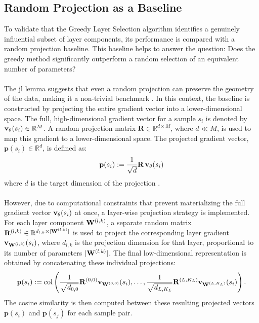 \subsection{Random Projection as a Baseline}\label{subsec:random_projection_as_a_baseline}
To validate that the Greedy Layer Selection algorithm identifies a genuinely influential subset of layer components, its performance is compared with a random projection baseline. This baseline helps to answer the question: Does the greedy method significantly outperform a random selection of an equivalent number of parameters?
\\\\
The \acrfull{jl} lemma suggests that even a random projection can preserve the geometry of the data, making it a non-trivial benchmark \cite{johnson_lindenstrauss}. In this context, the baseline is constructed by projecting the entire gradient vector into a lower-dimensional space. The full, high-dimensional gradient vector for a sample $s_i$ is denoted by $\vXsi[\theta] \in \mathbb{R}^M$. A random projection matrix $\mathbf{R} \in \mathbb{R}^{d \times M}$, where $d \ll M$, is used to map this gradient to a lower-dimensional space. The projected gradient vector, $\mathbf{p}(s_i) \in \mathbb{R}^d$, is defined as:
\begin{equation}
    \mathbf{p}(s_i) := \frac{1}{\sqrt{d}} \mathbf{R} \, \vXsi[\theta]
\end{equation}
where $d$ is the target dimension of the projection \cite{rakhshan2022rademacherrandomprojectionstensor}.
\\\\
However, due to computational constraints that prevent materializing the full gradient vector $\vXsi[\theta]$ at once, a layer-wise projection strategy is implemented. For each layer component $\Wlk$, a separate random matrix $\mathbf{R}^{(l,k)} \in \mathbb{R}^{d_{l,k} \times |\Wlk|}$ is used to project the corresponding layer gradient $\vXsi[\Wlk]$, where $d_{l,k}$ is the projection dimension for that layer, proportional to its number of parameters $|\Wlk|$. The final low-dimensional representation is obtained by concatenating these individual projections:
\begin{equation}
    \mathbf{p}(s_i) := \operatorname{col}\left( \frac{1}{\sqrt{d_{0,0}}} \mathbf{R}^{(0,0)} \vXsi[\W^{(0,0)}], \dots, \frac{1}{\sqrt{d_{L,K_L}}} \mathbf{R}^{(L,K_L)} \vXsi[\W^{(L,K_L)}] \right).
\end{equation}
The cosine similarity is then computed between these resulting projected vectors $\mathbf{p}(s_i)$ and $\mathbf{p}(s_j)$ for each sample pair.
